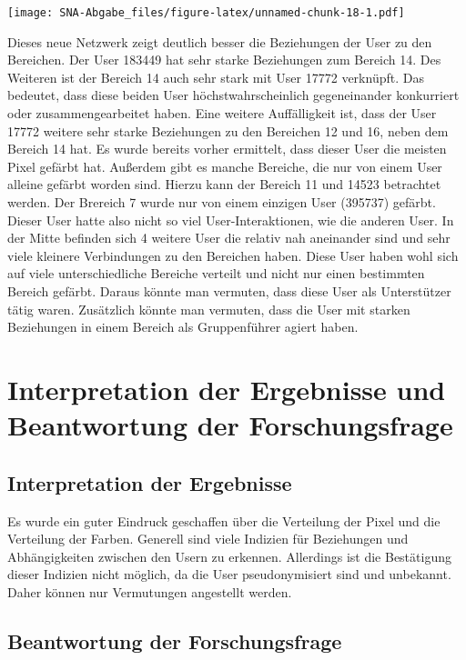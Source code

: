 \documentclass[
]{article}
\begin{document}
\texttt{[image: SNA-Abgabe\_files/figure-latex/unnamed-chunk-18-1.pdf]}

Dieses neue Netzwerk zeigt deutlich besser die Beziehungen der User zu
den Bereichen. Der User 183449 hat sehr starke Beziehungen zum Bereich
14. Des Weiteren ist der Bereich 14 auch sehr stark mit User 17772
verknüpft. Das bedeutet, dass diese beiden User höchstwahrscheinlich
gegeneinander konkurriert oder zusammengearbeitet haben. Eine weitere
Auffälligkeit ist, dass der User 17772 weitere sehr starke Beziehungen
zu den Bereichen 12 und 16, neben dem Bereich 14 hat. Es wurde bereits
vorher ermittelt, dass dieser User die meisten Pixel gefärbt hat.
Außerdem gibt es manche Bereiche, die nur von einem User alleine gefärbt
worden sind. Hierzu kann der Bereich 11 und 14523 betrachtet werden. Der
Brereich 7 wurde nur von einem einzigen User (395737) gefärbt. Dieser
User hatte also nicht so viel User-Interaktionen, wie die anderen User.
In der Mitte befinden sich 4 weitere User die relativ nah aneinander
sind und sehr viele kleinere Verbindungen zu den Bereichen haben. Diese
User haben wohl sich auf viele unterschiedliche Bereiche verteilt und
nicht nur einen bestimmten Bereich gefärbt. Daraus könnte man vermuten,
dass diese User als Unterstützer tätig waren. Zusätzlich könnte man
vermuten, dass die User mit starken Beziehungen in einem Bereich als
Gruppenführer agiert haben.

\section{Interpretation der Ergebnisse und Beantwortung der
Forschungsfrage}\label{interpretation-der-ergebnisse-und-beantwortung-der-forschungsfrage}

\subsection{Interpretation der
Ergebnisse}\label{interpretation-der-ergebnisse}

Es wurde ein guter Eindruck geschaffen über die Verteilung der Pixel und
die Verteilung der Farben. Generell sind viele Indizien für Beziehungen
und Abhängigkeiten zwischen den Usern zu erkennen. Allerdings ist die
Bestätigung dieser Indizien nicht möglich, da die User pseudonymisiert
sind und unbekannt. Daher können nur Vermutungen angestellt werden.

\subsection{Beantwortung der
Forschungsfrage}\label{beantwortung-der-forschungsfrage}
\end{document}
